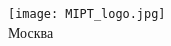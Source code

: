 \begin{center}
    \texttt{[image: MIPT\_logo.jpg]}\\
    Москва \the\year{}
\end{center}

\thispagestyle{empty}

\newpage
\fancyfoot[C]{\thepage}
\fancyhead[L]{}
\fancyhead[R]{}

\normalsize
